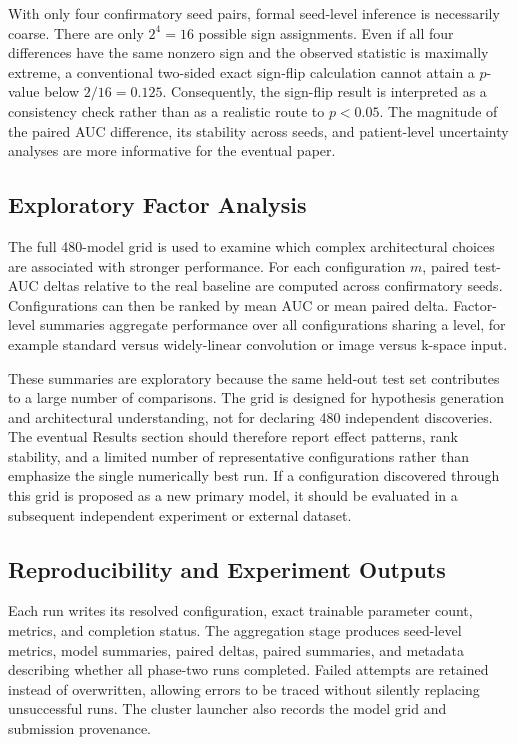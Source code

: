 \documentclass[journal]{IEEEtran}
\begin{document}
With only four confirmatory seed pairs, formal seed-level inference is necessarily coarse. There are only $2^4=16$ possible sign assignments. Even if all four differences have the same nonzero sign and the observed statistic is maximally extreme, a conventional two-sided exact sign-flip calculation cannot attain a $p$-value below $2/16=0.125$. Consequently, the sign-flip result is interpreted as a consistency check rather than as a realistic route to $p<0.05$. The magnitude of the paired AUC difference, its stability across seeds, and patient-level uncertainty analyses are more informative for the eventual paper.

\subsection{Exploratory Factor Analysis}
The full 480-model grid is used to examine which complex architectural choices are associated with stronger performance. For each configuration $m$, paired test-AUC deltas relative to the real baseline are computed across confirmatory seeds. Configurations can then be ranked by mean AUC or mean paired delta. Factor-level summaries aggregate performance over all configurations sharing a level, for example standard versus widely-linear convolution or image versus k-space input.

These summaries are exploratory because the same held-out test set contributes to a large number of comparisons. The grid is designed for hypothesis generation and architectural understanding, not for declaring 480 independent discoveries. The eventual Results section should therefore report effect patterns, rank stability, and a limited number of representative configurations rather than emphasize the single numerically best run. If a configuration discovered through this grid is proposed as a new primary model, it should be evaluated in a subsequent independent experiment or external dataset.

\subsection{Reproducibility and Experiment Outputs}
Each run writes its resolved configuration, exact trainable parameter count, metrics, and completion status. The aggregation stage produces seed-level metrics, model summaries, paired deltas, paired summaries, and metadata describing whether all phase-two runs completed. Failed attempts are retained instead of overwritten, allowing errors to be traced without silently replacing unsuccessful runs. The cluster launcher also records the model grid and submission provenance.
\end{document}
